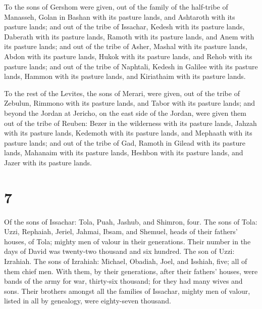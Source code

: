  To the sons of Gershom were given, out of the family of
the half-tribe of Manasseh, Golan in Bashan with its pasture lands, and
Ashtaroth with its pasture lands;  and out of the tribe of
Issachar, Kedesh with its pasture lands, Daberath with its pasture
lands,  Ramoth with its pasture lands, and Anem with its
pasture lands;  and out of the tribe of Asher, Mashal with
its pasture lands, Abdon with its pasture lands,  Hukok
with its pasture lands, and Rehob with its pasture lands; 
and out of the tribe of Naphtali, Kedesh in Galilee with its pasture
lands, Hammon with its pasture lands, and Kiriathaim with its pasture
lands.

 To the rest of the Levites, the sons of Merari, were
given, out of the tribe of Zebulun, Rimmono with its pasture lands, and
Tabor with its pasture lands;  and beyond the Jordan at
Jericho, on the east side of the Jordan, were given them out of the
tribe of Reuben: Bezer in the wilderness with its pasture lands, Jahzah
with its pasture lands,  Kedemoth with its pasture lands,
and Mephaath with its pasture lands;  and out of the tribe
of Gad, Ramoth in Gilead with its pasture lands, Mahanaim with its
pasture lands,  Heshbon with its pasture lands, and Jazer
with its pasture lands.

\hypertarget{section-6}{%
\section{7}\label{section-6}}

 Of the sons of Issachar: Tola, Puah, Jashub, and Shimron,
four.  The sons of Tola: Uzzi, Rephaiah, Jeriel, Jahmai,
Ibsam, and Shemuel, heads of their fathers' houses, of Tola; mighty men
of valour in their generations. Their number in the days of David was
twenty-two thousand and six hundred.  The son of Uzzi:
Izrahiah. The sons of Izrahiah: Michael, Obadiah, Joel, and Isshiah,
five; all of them chief men.  With them, by their
generations, after their fathers' houses, were bands of the army for
war, thirty-six thousand; for they had many wives and sons. 
Their brothers amongst all the families of Issachar, mighty men of
valour, listed in all by genealogy, were eighty-seven thousand.

